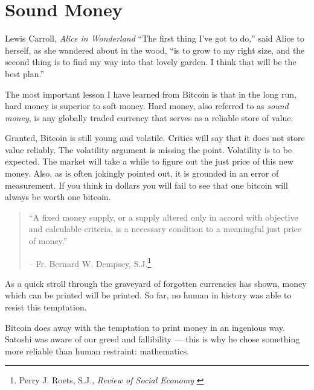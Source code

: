 \chapter{Sound Money}
\label{les:14}

\begin{chapquote}{Lewis Carroll, \textit{Alice in Wonderland}}
\enquote{The first thing I've got to do,} said Alice to herself, as she wandered about
in the wood, \enquote{is to grow to my right size, and the second thing is to find my
way into that lovely garden. I think that will be the best plan.}
\end{chapquote}

The most important lesson I have learned from Bitcoin is that in the
long run, hard money is superior to soft money. Hard money, also
referred to as \textit{sound money}, is any globally traded currency that
serves as a reliable store of value.

Granted, Bitcoin is still young and volatile. Critics will say that it
does not store value reliably. The volatility argument is missing the
point. Volatility is to be expected. The market will take a while to
figure out the just price of this new money. Also, as is often jokingly
pointed out, it is grounded in an error of measurement. If you think in
dollars you will fail to see that one bitcoin will always be worth one
bitcoin.

\begin{quotation}\begin{samepage}
\enquote{A fixed money supply, or a supply altered only in accord with
objective and calculable criteria, is a necessary condition to a
meaningful just price of money.}
\begin{flushright} -- Fr. Bernard W. Dempsey, S.J.\footnote{Perry J. Roets, S.J., \textit{Review of Social Economy} \cite{review-social-economy}}
\end{flushright}\end{samepage}\end{quotation}

\newpage

As a quick stroll through the graveyard of forgotten currencies has
shown, money which can be printed will be printed. So far, no human in
history was able to resist this temptation.

Bitcoin does away with the temptation to print money in an ingenious
way. Satoshi was aware of our greed and fallibility --- this is why he
chose something more reliable than human restraint: mathematics.

